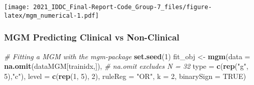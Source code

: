 \documentclass[
]{article}
\newenvironment{Shaded}{\begin{snugshade}}{\end{snugshade}}
\newcommand{\CommentTok}[1]{\textcolor[rgb]{0.56,0.35,0.01}{\textit{#1}}}
\newcommand{\DataTypeTok}[1]{\textcolor[rgb]{0.13,0.29,0.53}{#1}}
\newcommand{\DecValTok}[1]{\textcolor[rgb]{0.00,0.00,0.81}{#1}}
\newcommand{\KeywordTok}[1]{\textcolor[rgb]{0.13,0.29,0.53}{\textbf{#1}}}
\newcommand{\NormalTok}[1]{#1}
\newcommand{\OperatorTok}[1]{\textcolor[rgb]{0.81,0.36,0.00}{\textbf{#1}}}
\newcommand{\OtherTok}[1]{\textcolor[rgb]{0.56,0.35,0.01}{#1}}
\newcommand{\StringTok}[1]{\textcolor[rgb]{0.31,0.60,0.02}{#1}}
\begin{document}
\texttt{[image: 2021\_IDDC\_Final-Report-Code\_Group-7\_files/figure-latex/mgm\_numerical-1.pdf]}

\hypertarget{mgm-predicting-clinical-vs-non-clinical}{%
\subsubsection{MGM Predicting Clinical vs
Non-Clinical}\label{mgm-predicting-clinical-vs-non-clinical}}

\begin{Shaded}
\end{Shaded}

\begin{Shaded}
\begin{Highlighting}[]
\CommentTok{# Fitting a MGM with the mgm-package}
\KeywordTok{set.seed}\NormalTok{(}\DecValTok{1}\NormalTok{)}
\NormalTok{fit_obj <-}\StringTok{ }\KeywordTok{mgm}\NormalTok{(}\DataTypeTok{data =} \KeywordTok{na.omit}\NormalTok{(dataMGM[trainidx,]), }\CommentTok{# na.omit excludes N = 32 }
                \DataTypeTok{type =} \KeywordTok{c}\NormalTok{(}\KeywordTok{rep}\NormalTok{(}\StringTok{"g"}\NormalTok{, }\DecValTok{5}\NormalTok{),}\StringTok{"c"}\NormalTok{),}
                \DataTypeTok{level =} \KeywordTok{c}\NormalTok{(}\KeywordTok{rep}\NormalTok{(}\DecValTok{1}\NormalTok{, }\DecValTok{5}\NormalTok{), }\DecValTok{2}\NormalTok{),}
                \DataTypeTok{ruleReg =} \StringTok{"OR"}\NormalTok{,}
                \DataTypeTok{k =} \DecValTok{2}\NormalTok{,}
                \DataTypeTok{binarySign =} \OtherTok{TRUE}\NormalTok{)}
\end{Highlighting}
\end{Shaded}
\end{document}
